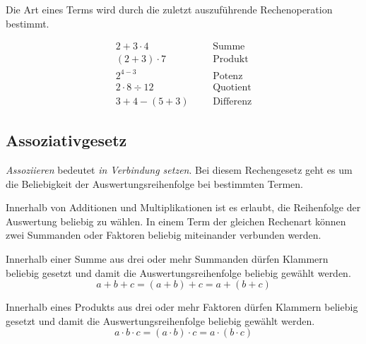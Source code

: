 \begin{regel}
 Die Art eines Terms wird durch die zuletzt auszuführende Rechenoperation bestimmt.
\end{regel}

\begin{bsp}
\begin{align*}
 2+3\cdot 4 &&& \text{Summe} \\
 (2+3)\cdot 7 &&& \text{Produkt} \\
 2^{4-3} &&& \text{Potenz} \\
 2\cdot 8 \div 12 &&& \text{Quotient} \\
 3+4-(5+3) &&& \text{Differenz}
\end{align*}
\end{bsp}


\subsection*{Assoziativgesetz}
\label{ssec:ass} 

\emph{Assoziieren} bedeutet \emph{in Verbindung setzen}. Bei diesem Rechengesetz geht es um die Beliebigkeit der Auswertungsreihenfolge bei bestimmten Termen.

\begin{center}
\end{center}

Innerhalb von Additionen und Multiplikationen ist es erlaubt, die Reihenfolge der Auswertung beliebig zu wählen. In einem Term der gleichen Rechenart können zwei Summanden oder Faktoren beliebig miteinander verbunden werden. 

\begin{regel}
 Innerhalb einer Summe aus drei oder mehr Summanden dürfen Klammern beliebig gesetzt und damit die Auswertungsreihenfolge beliebig gewählt werden.
 \[ a+b+c = (a+b)+c = a+(b+c) \]
\end{regel}
\begin{regel}
 Innerhalb eines Produkts aus drei oder mehr Faktoren dürfen Klammern beliebig gesetzt und damit die Auswertungsreihenfolge beliebig gewählt werden.
\[ a\cdot b\cdot c = (a\cdot b) \cdot c = a\cdot (b\cdot c)\]
\end{regel}

